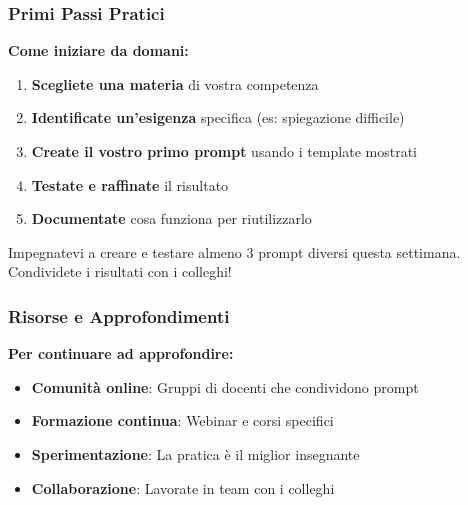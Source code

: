 \documentclass[aspectratio=169]{beamer}
\begin{document}
%
%
\begin{frame}
\frametitle{Primi Passi Pratici}
\textbf{Come iniziare da domani:}

\begin{enumerate}
    \item \textbf{Scegliete una materia} di vostra competenza
    \item \textbf{Identificate un'esigenza} specifica (es: spiegazione difficile)
    \item \textbf{Create il vostro primo prompt} usando i template mostrati
    \item \textbf{Testate e raffinate} il risultato
    \item \textbf{Documentate} cosa funziona per riutilizzarlo
\end{enumerate}

\pause
\vspace{1cm}
\begin{examplebox}
Impegnatevi a creare e testare almeno 3 prompt diversi questa settimana. Condividete i risultati con i colleghi!
\end{examplebox}
\end{frame}
%
%
\begin{frame}
\frametitle{Risorse e Approfondimenti}
\textbf{Per continuare ad approfondire:}

\begin{itemize}
    \item \textbf{Comunità online}: Gruppi di docenti che condividono prompt
    \item \textbf{Formazione continua}: Webinar e corsi specifici
    \item \textbf{Sperimentazione}: La pratica è il miglior insegnante
    \item \textbf{Collaborazione}: Lavorate in team con i colleghi
\end{itemize}
\end{frame}
%
%
\end{document}
